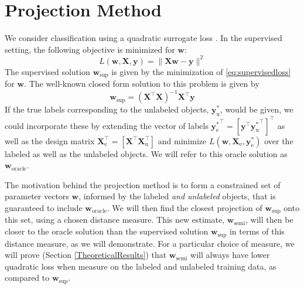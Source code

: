 \documentclass{article}
\newcommand{\Xe}{\vec{X}_\mathrm{e}  }
\renewcommand{\vec}[1]{\mathbf{#1}}
\begin{document}
\section{Projection Method}
\label{section:projections}
We consider classification using a quadratic surrogate loss \citep{Hastie2001}. In the supervised setting, the following objective is minimized for $\vec{w}$:
\begin{equation}
\label{eq:supervisedloss}
L(\vec{w},\vec{X},\vec{y}) = \lVert \vec{X} \vec{w} - \vec{y} \rVert^2
\end{equation}
The supervised solution $\vec{w}_{\text{sup}}$ is given by the minimization of \eqref{eq:supervisedloss} for $\vec{w}$. The well-known closed form solution to this problem is given by
\begin{equation}
\label{eq:supervisedsolution}
\vec{w}_{\text{sup}} = (\vec{X}^\top \vec{X})^{-1} \vec{X}^\top \vec{y}
\end{equation}
If the true labels corresponding to the unlabeled objects, $\vec{y}_\text{u}^{\ast}$, would be given, we could incorporate these by extending the vector of labels ${\vec{y}_\text{e}^\ast}^\top = \left[ \vec{y}^\top {\vec{y}_\text{u}^\ast}^\top \right]^\top$ as well as the design matrix $\vec{X}_\text{e}^\top = \left[ \vec{X}^\top \vec{X}_\text{u}^\top \right]$ and minimize $L(\vec{w},\Xe, \vec{y}_\text{e}^\ast)$ over the labeled as well as the unlabeled objects. We will refer to this oracle solution as $\vec{w}_\text{oracle}$. 

The motivation behind the projection method is to form a constrained set of parameter vectors $\vec{w}$, informed by the labeled \emph{and unlabeled} objects, that is guaranteed to include $\vec{w}_\text{oracle}$. We will then find the closest projection of $\vec{w}_{\text{sup}}$ onto this set, using a chosen distance measure. This new estimate, $\vec{w}_{\text{semi}}$, will then be closer to the oracle solution than the supervised solution $\vec{w}_{\text{sup}}$ in terms of this distance measure, as we will demonstrate. For a particular choice of measure, we will prove (Section \ref{TheoreticalResults})  that $\vec{w}_{\text{semi}}$ will always have lower quadratic loss when measure on the labeled and unlabeled training data, as compared to $\vec{w}_{\text{sup}}$.
\end{document}
